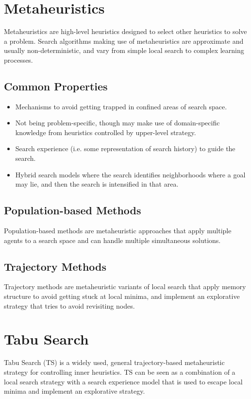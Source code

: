 \documentclass[12pt,titlepage]{article}
\begin{document}
  \newpage

  \section{Metaheuristics}
    Metaheuristics are high-level heuristics designed to select other heuristics to solve a problem. Search algorithms making use of metaheuristics are approximate
    and usually non-deterministic, and vary from simple local search to complex learning processes.

    \subsection{Common Properties}
      \begin{itemize}
        \item Mechanisms to avoid getting trapped in confined areas of search space.
        \item Not being problem-specific, though may make use of domain-specific knowledge from heuristics controlled by upper-level strategy.
        \item Search experience (i.e. some representation of search history) to guide the search.
        \item Hybrid search models where the search identifies neighborhoods where a goal may lie, and then the search is intensified in that area.
      \end{itemize}

    \subsection{Population-based Methods}
      Population-based methods are metaheuristic approaches that apply multiple agents to a search space and can handle multiple simultaneous solutions.

    \subsection{Trajectory Methods}
      Trajectory methods are metaheuristic variants of local search that apply memory structure to avoid getting stuck at local minima, and implement an explorative
      strategy that tries to avoid revisiting nodes.

  \newpage

  \section{Tabu Search}
    Tabu Search (TS) is a widely used, general trajectory-based metaheuristic strategy for controlling inner heuristics. TS can be seen as a combination of a local
    search strategy with a search experience model that is used to escape local minima and implement an explorative strategy.
\end{document}
